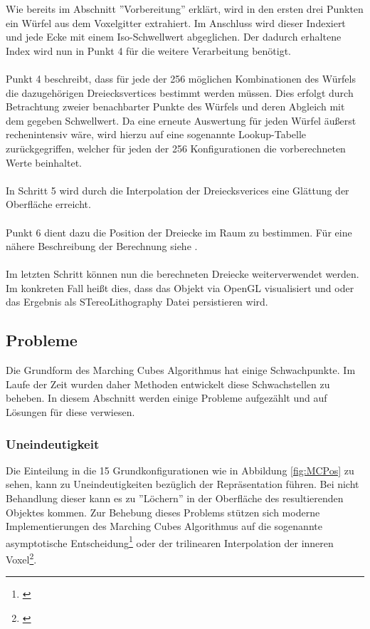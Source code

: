 \noindent Wie bereits im Abschnitt ''Vorbereitung'' erklärt, wird in den ersten drei Punkten ein Würfel aus dem Voxelgitter extrahiert. Im Anschluss wird dieser Indexiert und jede Ecke mit einem Iso-Schwellwert abgeglichen. Der dadurch erhaltene Index wird nun in Punkt 4 für die weitere Verarbeitung benötigt. \\
\\
Punkt 4 beschreibt, dass für jede der 256 möglichen Kombinationen des Würfels die dazugehörigen Dreiecksvertices bestimmt werden müssen. Dies erfolgt durch Betrachtung zweier benachbarter Punkte des Würfels und deren Abgleich mit dem gegeben Schwellwert. Da eine erneute Auswertung für jeden Würfel äußerst rechenintensiv wäre, wird hierzu auf eine sogenannte Lookup-Tabelle zurückgegriffen, welcher für jeden der 256 Konfigurationen die vorberechneten Werte beinhaltet. \\
\\
In Schritt 5 wird durch die Interpolation der Dreiecksverices eine Glättung der Oberfläche erreicht.\\
\\
Punkt 6 dient dazu die Position der Dreiecke im Raum zu bestimmen. Für eine nähere Beschreibung der Berechnung siehe \citep{MCAlgo}.\\
\\
Im letzten Schritt können nun die berechneten Dreiecke weiterverwendet werden. Im konkreten Fall heißt dies, dass das Objekt via OpenGL visualisiert und oder das Ergebnis als STereoLithography Datei persistieren wird.

\subsection{Probleme}
\label{sec:schwach}
Die Grundform des Marching Cubes Algorithmus hat einige Schwachpunkte. Im Laufe der Zeit wurden daher Methoden entwickelt diese Schwachstellen zu beheben. In diesem Abschnitt werden einige Probleme aufgezählt und auf Lösungen für diese verwiesen.

\subsubsection{Uneindeutigkeit}
Die Einteilung in die 15 Grundkonfigurationen wie in Abbildung \ref{fig:MCPos} zu sehen, kann zu Uneindeutigkeiten bezüglich der Repräsentation führen. Bei nicht Behandlung dieser kann es zu ''Löchern'' in der Oberfläche des resultierenden Objektes kommen. Zur Behebung dieses Problems stützen sich moderne Implementierungen des Marching Cubes Algorithmus auf die sogenannte asymptotische Entscheidung\footnote{\citep{Leak1}} oder der trilinearen Interpolation der inneren Voxel\footnote{\citep{Leak2}}.
